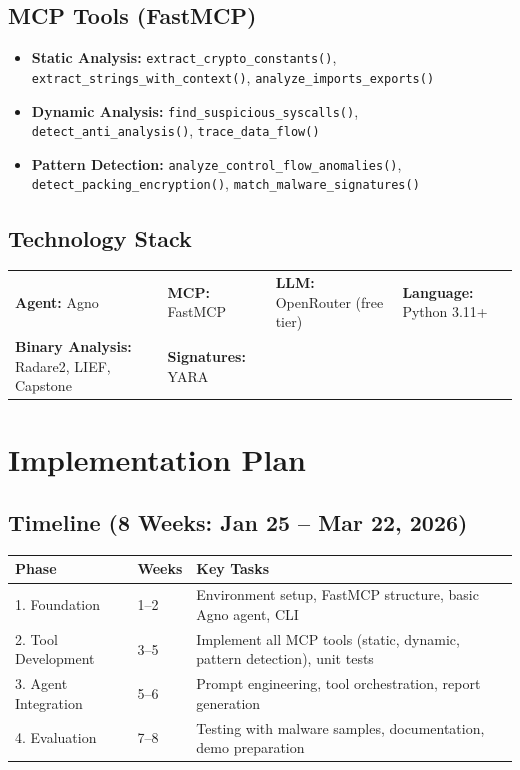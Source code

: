 \documentclass[11pt,a4paper]{article}
\begin{document}
\subsection{MCP Tools (FastMCP)}
\begin{itemize}
    \item \textbf{Static Analysis:} \texttt{extract\_crypto\_constants()}, \texttt{extract\_strings\_with\_context()}, \texttt{analyze\_imports\_exports()}
    \item \textbf{Dynamic Analysis:} \texttt{find\_suspicious\_syscalls()}, \texttt{detect\_anti\_analysis()}, \texttt{trace\_data\_flow()}
    \item \textbf{Pattern Detection:} \texttt{analyze\_control\_flow\_anomalies()}, \texttt{detect\_packing\_encryption()}, \texttt{match\_malware\_signatures()}
\end{itemize}

\subsection{Technology Stack}
\begin{tabular}{@{}llll@{}}
\textbf{Agent:} Agno & \textbf{MCP:} FastMCP & \textbf{LLM:} OpenRouter (free tier) & \textbf{Language:} Python 3.11+ \\
\textbf{Binary Analysis:} Radare2, LIEF, Capstone & \textbf{Signatures:} YARA & & \\
\end{tabular}

\section{Implementation Plan}

\subsection{Timeline (8 Weeks: Jan 25 – Mar 22, 2026)}
\begin{tabular}{@{}llp{9cm}@{}}
\toprule
\textbf{Phase} & \textbf{Weeks} & \textbf{Key Tasks} \\
\midrule
1. Foundation & 1–2 & Environment setup, FastMCP structure, basic Agno agent, CLI \\
2. Tool Development & 3–5 & Implement all MCP tools (static, dynamic, pattern detection), unit tests \\
3. Agent Integration & 5–6 & Prompt engineering, tool orchestration, report generation \\
4. Evaluation & 7–8 & Testing with malware samples, documentation, demo preparation \\
\bottomrule
\end{tabular}
\end{document}
